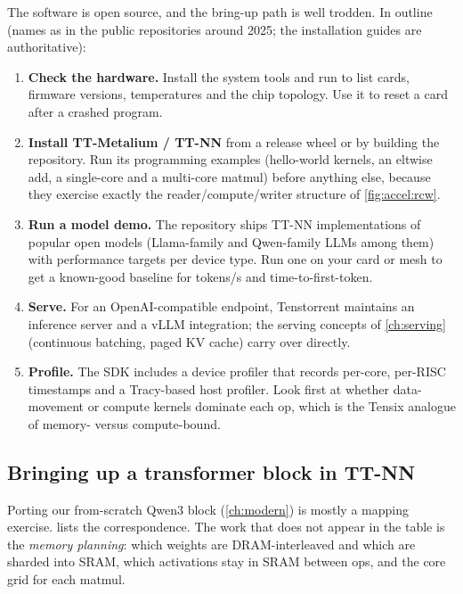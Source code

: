 The software is open source, and the bring-up path is well trodden. In outline (names as in the public
repositories around 2025; the installation guides are authoritative):
\begin{enumerate}
  \item \textbf{Check the hardware.} Install the system tools and run  to list cards,
    firmware versions, temperatures and the chip topology. Use it to reset a card after a crashed
    program.
  \item \textbf{Install TT-Metalium / TT-NN} from a release wheel or by building the
     repository. Run its programming examples (hello-world kernels, an eltwise
    add, a single-core and a multi-core matmul) before anything else, because they exercise exactly the
    reader/compute/writer structure of \cref{fig:accel:rcw}.
  \item \textbf{Run a model demo.} The repository ships TT-NN implementations of popular open models
    (Llama-family and Qwen-family LLMs among them) with performance targets per device type. Run one
    on your card or mesh to get a known-good baseline for tokens/s and time-to-first-token.
  \item \textbf{Serve.} For an OpenAI-compatible endpoint, Tenstorrent maintains an inference server
    and a vLLM integration; the serving concepts of \cref{ch:serving} (continuous batching, paged KV
    cache) carry over directly.
  \item \textbf{Profile.} The SDK includes a device profiler that records per-core, per-RISC
    timestamps and a Tracy-based host profiler. Look first at whether data-movement or compute kernels
    dominate each op, which is the Tensix analogue of memory- versus compute-bound.
\end{enumerate}

\subsection{Bringing up a transformer block in TT-NN}

Porting our from-scratch Qwen3 block (\cref{ch:modern}) is mostly a mapping exercise.
 lists the correspondence. The work that does not appear in the table is the
\emph{memory planning}: which weights are DRAM-interleaved and which are sharded into SRAM, which
activations stay in SRAM between ops, and the core grid for each matmul.

